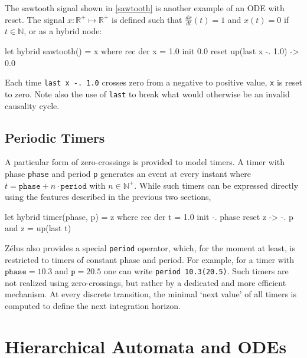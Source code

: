 \documentclass[11pt,titlepage,twoside]{report}
\makeatletter
\newcommand{\zls}[1]{{\@span{class="zelusinline"}#1}}
\newcommand{\zls}[1]{\texttt{#1}}
\renewcommand{\zls}[1]{\texttt{#1}}
\newcommand{\zelus}{{\sf Z\'elus}}
\newcommand{\DotNotation}[1]{\frac{\mathit{d}{#1}}{\mathit{dt}}}
\newcommand{\bR}{\mathbb{R}}
\newcommand{\bN}{\mathbb{N}}
\makeatother
\begin{document}
The sawtooth signal shown in \cref{sawtooth} is another example of an ODE 
with reset.
The signal $x: \bR^+ \mapsto \bR^+$ is defined such that $\DotNotation{x}(t) 
= 1$ and
$x(t) = 0$ if $t\in\bN$, or as a hybrid node:
\begin{chklisting}[withresult]
let hybrid sawtooth() = x where
  rec der x = 1.0 init 0.0 reset up(last x -. 1.0) -> 0.0
\end{chklisting}
%
Each time \zls{last x -. 1.0} crosses zero from a negative to positive 
value, \zls{x} is reset to zero.
Note also the use of \zls{last} to break what would otherwise be an invalid 
causality cycle.

\subsection{Periodic Timers\label{periodictimers}} %

A particular form of zero-crossings is provided to model timers.
A timer with phase \zls{phase} and period \zls{p} generates
an event at every instant where $t = \mathtt{phase} + n \cdot 
\mathtt{period}$ with $n \in \bN^+$.
While such timers can be expressed directly using the features described in 
the previous two sections,
\begin{chklisting}[withresult]
let hybrid timer(phase, p) = z where
  rec der t = 1.0 init -. phase reset z -> -. p
  and z = up(last t)
\end{chklisting}
\zelus{} also provides a special \zls{period} operator, which, for the 
moment at least, is restricted to timers of constant phase and period.
For example, for a timer with $\mathtt{phase} = 10.3$ and $\mathtt{p} = 20.5$
one can write \zls{period 10.3(20.5)}.
Such timers are not realized using zero-crossings, but rather by a dedicated 
and more efficient mechanism.
At every discrete transition, the minimal `next value' of all timers is 
computed to define the next integration horizon.

\section{Hierarchical Automata and ODEs\label{hautoodes}} %
\end{document}

